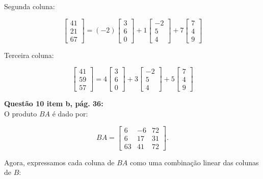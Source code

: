 \documentclass[a4paper,12pt]{article}
\begin{document}
Segunda coluna:

\[
\begin{bmatrix} 41 \\ 21 \\ 67 \end{bmatrix} =
(-2) \begin{bmatrix} 3 \\ 6 \\ 0 \end{bmatrix} +
1 \begin{bmatrix} -2 \\ 5 \\ 4 \end{bmatrix} +
7 \begin{bmatrix} 7 \\ 4 \\ 9 \end{bmatrix}
\]

Terceira coluna:

\[
\begin{bmatrix} 41 \\ 59 \\ 57 \end{bmatrix} =
4 \begin{bmatrix} 3 \\ 6 \\ 0 \end{bmatrix} +
3 \begin{bmatrix} -2 \\ 5 \\ 4 \end{bmatrix} +
5 \begin{bmatrix} 7 \\ 4 \\ 9 \end{bmatrix}
\]


\textbf{Questão 10 item b, pág. 36:}\\

O produto \( BA \) é dado por:

\[
BA = \begin{bmatrix}
6 & -6 & 72 \\
6 & 17 & 31 \\
63 & 41 & 72
\end{bmatrix}.
\]

Agora, expressamos cada coluna de \( BA \) como uma combinação linear das colunas de \( B \):
\end{document}
